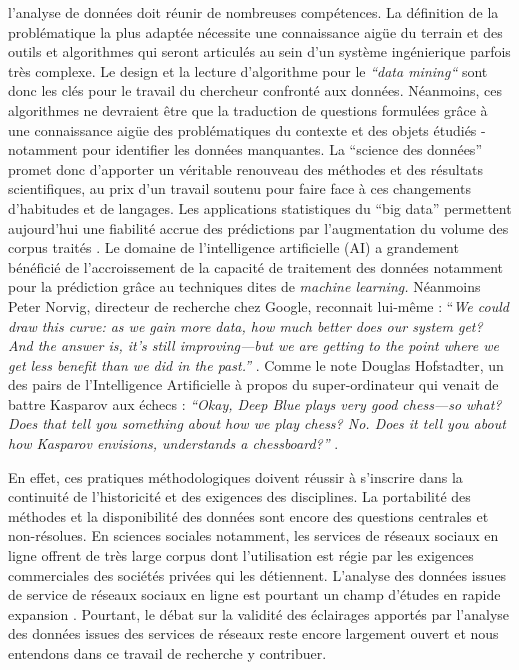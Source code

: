 l{\textquoteright}analyse de donn\'ees doit r\'eunir de nombreuses
comp\'etences. La d\'efinition de la probl\'ematique la plus adapt\'ee
n\'ecessite une connaissance aig\"ue du terrain et des outils et
algorithmes qui seront articul\'es au sein d{\textquoteright}un
syst\`eme ing\'enierique parfois tr\`es complexe. Le design et la
lecture d{\textquoteright}algorithme pour le
\textit{{\textquotedblleft}data mining{\textquotedblleft}} sont donc
les cl\'es pour le travail du chercheur confront\'e aux donn\'ees.
N\'eanmoins, ces algorithmes ne devraient \^etre que la traduction de
questions formul\'ees gr\^ace \`a une connaissance aig\"ue des
probl\'ematiques du contexte et des objets \'etudi\'es - notamment pour
identifier les donn\'ees manquantes. La {\textquotedblleft}science des
donn\'ees{\textquotedblright} promet donc d{\textquoteright}apporter un
v\'eritable renouveau des m\'ethodes et des r\'esultats scientifiques,
au prix d{\textquoteright}un travail soutenu pour faire face \`a ces
changements d{\textquoteright}habitudes et de langages. Les
applications statistiques du {\textquotedblleft}big
data{\textquotedblright} permettent aujourd{\textquoteright}hui une
fiabilit\'e accrue des pr\'edictions par l{\textquoteright}augmentation
du volume des corpus trait\'es \cite{Breiman2001}. Le domaine de
l{\textquoteright}intelligence artificielle (AI) a grandement
b\'en\'efici\'e de l{\textquoteright}accroissement de la capacit\'e de
traitement des donn\'ees notamment pour la pr\'ediction gr\^ace au
techniques dites de \textit{machine learning. }N\'eanmoins Peter
Norvig, directeur de recherche chez Google, reconnait lui-m\^eme :
{\textquotedblleft}\textit{We could draw this curve: as we gain more
data, how much better does our system get? And the answer is,
it{\textquoteright}s still improving---but we are getting to the point
where we get less benefit than we did in the past.{\textquotedblright}
}\cite{Somers2013}. Comme le note Douglas Hofstadter, un des pairs de
l{\textquoteright}Intelligence Artificielle \`a propos du
super-ordinateur qui venait de battre Kasparov aux \'echecs :
\textit{{\textquotedblleft}Okay, Deep Blue plays very good chess---so
what? Does that tell you something about how we play chess? No. Does it
tell you about how Kasparov envisions, understands a
chessboard?{\textquotedblright} }\cite{Somers2013}. 

En effet, ces pratiques m\'ethodologiques doivent r\'eussir \`a
s{\textquoteright}inscrire dans la continuit\'e de
l{\textquoteright}historicit\'e et des exigences des disciplines. La
portabilit\'e des m\'ethodes et la disponibilit\'e des donn\'ees sont
encore des questions centrales et non-r\'esolues. En sciences sociales
notamment, les services de r\'eseaux sociaux en ligne offrent de tr\`es
large corpus dont l{\textquoteright}utilisation est r\'egie par les
exigences commerciales des soci\'et\'es priv\'ees qui les d\'etiennent.
L{\textquoteright}analyse des donn\'ees issues de service de r\'eseaux
sociaux en ligne est pourtant un champ d{\textquoteright}\'etudes en
rapide expansion \cite{Nettleton2013}. Pourtant, le d\'ebat sur la
validit\'e des \'eclairages apport\'es par l{\textquoteright}analyse
des donn\'ees issues des services de r\'eseaux reste encore largement
ouvert et nous entendons dans ce travail de recherche y contribuer. 

